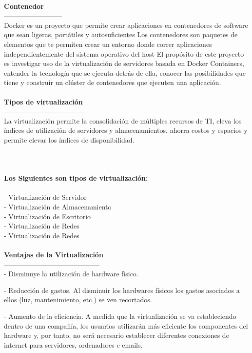 \documentclass[twoside,twocolumn]{article}
\begin{document}
\begin{flushright}
\begin{itemize}
\textbf{}\\
\textbf{Contenedor}\\
--------------------------
\textbf{}\\
Docker es un proyecto que permite crear aplicaciones en contenedores de software
que sean ligeras, portátiles y autosuficientes Los contenedores son paquetes de elementos
que te permiten crear un entorno donde correr aplicaciones independientemente del sistema
operativo del host El propósito de este proyecto es investigar uso de la virtualización
de servidores basada en Docker Containers, entender la tecnología que se ejecuta detrás de ella, 
conocer las posibilidades que tiene y construir un clúster de contenedores que ejecuten una aplicación.
\textbf{}\\
\textbf{}\\
\textbf{Tipos de virtualización}\\
------------------------------------
\textbf{}\\
La virtualización permite la consolidación de múltiples recursos de TI, 
eleva los índices de utilización de servidores y almacenamientos,
ahorra costos y espacios y permite elevar los índices de disponibilidad. 
\textbf{}\\
\textbf{}\\
\textbf{}\\
\textbf{}\\
\textbf{Los Siguientes son tipos de virtualización:}\\

\textbf{}\\
- Virtualización de Servidor
\textbf{}\\
- Virtualización de Almacenamiento
\textbf{}\\
- Virtualización de Escritorio
\textbf{}\\
- Virtualización de Redes
\textbf{}\\
- Virtualización de Redes
\textbf{}\\
\textbf{}\\
\textbf{Ventajas de la Virtualización}\\
------------------------------------------
\textbf{}\\
- Disminuye la utilización de hardware físico.

- Reducción de gastos. Al disminuir los hardwares físicos los gastos asociados a ellos (luz, mantenimiento, etc.) se ven recortados.

- Aumento de la eficiencia. A medida que la virtualización se va estableciendo dentro de una compañía, los usuarios utilizarán más eficiente los componentes del hardware y, por tanto, no será necesario establecer diferentes conexiones de internet para servidores, ordenadores e emails.


\end{itemize}
\end{flushright}
\end{document}
